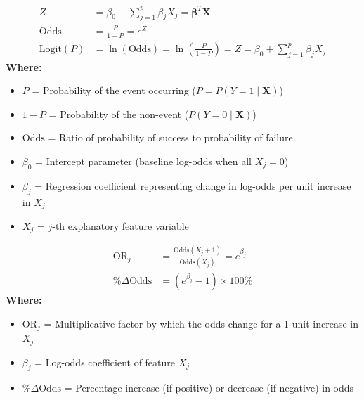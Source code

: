 \begin{formulabox}
\begin{align*}
    Z &= \beta_0 + \sum_{j=1}^p \beta_j X_j = \boldsymbol{\beta}^T \mathbf{X} \\[2pt]
    \text{Odds} &= \frac{P}{1 - P} = e^Z \\[2pt]
    \text{Logit}(P) &= \ln(\text{Odds}) = \ln\left(\frac{P}{1 - P}\right) = Z = \beta_0 + \sum_{j=1}^p \beta_j X_j
\end{align*}
\textbf{Where:}
\begin{itemize}[noitemsep, topsep=1pt]
    \item $P$ = Probability of the event occurring ($P = P(Y=1 \mid \mathbf{X})$)
    \item $1 - P$ = Probability of the non-event ($P(Y=0 \mid \mathbf{X})$)
    \item $\text{Odds}$ = Ratio of probability of success to probability of failure
    \item $\beta_0$ = Intercept parameter (baseline log-odds when all $X_j = 0$)
    \item $\beta_j$ = Regression coefficient representing change in log-odds per unit increase in $X_j$
    \item $X_j$ = $j$-th explanatory feature variable
\end{itemize}
\end{formulabox}

\begin{formulabox}
\begin{align*}
    \text{OR}_j &= \frac{\text{Odds}(X_j + 1)}{\text{Odds}(X_j)} = e^{\beta_j} \\[2pt]
    \%\Delta\text{Odds} &= (e^{\beta_j} - 1) \times 100\%
\end{align*}
\textbf{Where:}
\begin{itemize}[noitemsep, topsep=1pt]
    \item $\text{OR}_j$ = Multiplicative factor by which the odds change for a 1-unit increase in $X_j$
    \item $\beta_j$ = Log-odds coefficient of feature $X_j$
    \item $\%\Delta\text{Odds}$ = Percentage increase (if positive) or decrease (if negative) in odds
\end{itemize}
\end{formulabox}

